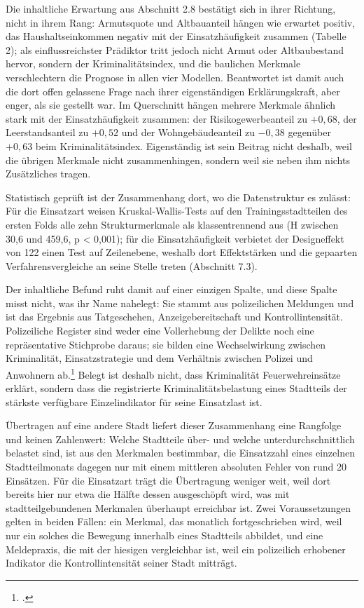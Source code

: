 \documentclass[12pt,a4paper]{article}
\begin{document}
Die inhaltliche Erwartung aus Abschnitt 2.8 bestätigt sich in ihrer Richtung, nicht in ihrem Rang: Armutsquote und Altbauanteil hängen wie erwartet positiv, das Haushaltseinkommen negativ mit der Einsatzhäufigkeit zusammen (Tabelle 2); als einflussreichster Prädiktor tritt jedoch nicht Armut oder Altbaubestand hervor, sondern der Kriminalitätsindex, und die baulichen Merkmale verschlechtern die Prognose in allen vier Modellen. Beantwortet ist damit auch die dort offen gelassene Frage nach ihrer eigenständigen Erklärungskraft, aber enger, als sie gestellt war. Im Querschnitt hängen mehrere Merkmale ähnlich stark mit der Einsatzhäufigkeit zusammen: der Risikogewerbeanteil zu $+0{,}68$, der Leerstandsanteil zu $+0{,}52$ und der Wohngebäudeanteil zu $-0{,}38$ gegenüber $+0{,}63$ beim Kriminalitätsindex. Eigenständig ist sein Beitrag nicht deshalb, weil die übrigen Merkmale nicht zusammenhingen, sondern weil sie neben ihm nichts Zusätzliches tragen.

Statistisch geprüft ist der Zusammenhang dort, wo die Datenstruktur es zulässt: Für die Einsatzart weisen Kruskal-Wallis-Tests auf den Trainingsstadtteilen des ersten Folds alle zehn Strukturmerkmale als klassentrennend aus (H zwischen 30,6 und 459,6, p < 0,001); für die Einsatzhäufigkeit verbietet der Designeffekt von 122 einen Test auf Zeilenebene, weshalb dort Effektstärken und die gepaarten Verfahrensvergleiche an seine Stelle treten (Abschnitt 7.3).

Der inhaltliche Befund ruht damit auf einer einzigen Spalte, und diese Spalte misst nicht, was ihr Name nahelegt: Sie stammt aus polizeilichen Meldungen und ist das Ergebnis aus Tatgeschehen, Anzeigebereitschaft und Kontrollintensität. Polizeiliche Register sind weder eine Vollerhebung der Delikte noch eine repräsentative Stichprobe daraus; sie bilden eine Wechselwirkung zwischen Kriminalität, Einsatzstrategie und dem Verhältnis zwischen Polizei und Anwohnern ab.\footcite[15-16]{LumIsaac2016} Belegt ist deshalb nicht, dass Kriminalität Feuerwehreinsätze erklärt, sondern dass die registrierte Kriminalitätsbelastung eines Stadtteils der stärkste verfügbare Einzelindikator für seine Einsatzlast ist.

Übertragen auf eine andere Stadt liefert dieser Zusammenhang eine Rangfolge und keinen Zahlenwert: Welche Stadtteile über- und welche unterdurchschnittlich belastet sind, ist aus den Merkmalen bestimmbar, die Einsatzzahl eines einzelnen Stadtteilmonats dagegen nur mit einem mittleren absoluten Fehler von rund 20 Einsätzen. Für die Einsatzart trägt die Übertragung weniger weit, weil dort bereits hier nur etwa die Hälfte dessen ausgeschöpft wird, was mit stadtteilgebundenen Merkmalen überhaupt erreichbar ist. Zwei Voraussetzungen gelten in beiden Fällen: ein Merkmal, das monatlich fortgeschrieben wird, weil nur ein solches die Bewegung innerhalb eines Stadtteils abbildet, und eine Meldepraxis, die mit der hiesigen vergleichbar ist, weil ein polizeilich erhobener Indikator die Kontrollintensität seiner Stadt mitträgt.
\end{document}
